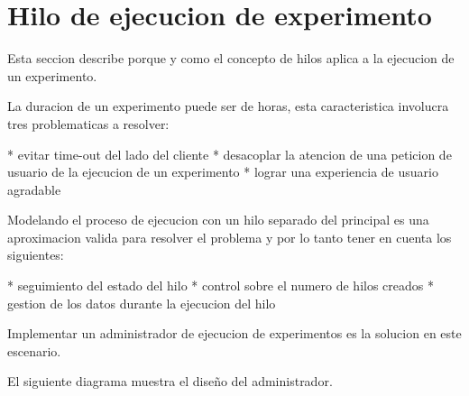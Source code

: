 \section{Hilo de ejecucion de experimento}

Esta seccion describe porque y como el concepto de hilos aplica a la ejecucion de un experimento.

La duracion de un experimento puede ser de horas, esta caracteristica involucra tres problematicas
a resolver:

* evitar time-out del lado del cliente
* desacoplar la atencion de una peticion de usuario de la ejecucion de un experimento
* lograr una experiencia de usuario agradable

Modelando el proceso de ejecucion con un hilo separado del principal es una aproximacion
valida para resolver el problema y por lo tanto tener en cuenta los siguientes:

* seguimiento del estado del hilo
* control sobre el numero de hilos creados
* gestion de los datos durante la ejecucion del hilo

Implementar un administrador de ejecucion de experimentos es la solucion en este escenario.

El siguiente diagrama muestra el diseño del administrador.
